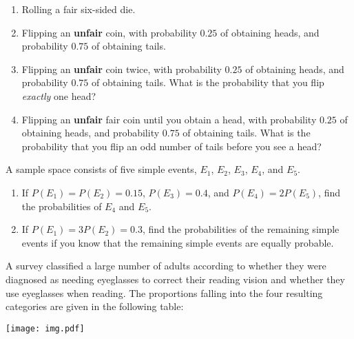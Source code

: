 \documentclass[12pt,reqno]{amsart}
\begin{document}
\medskip
\begin{enumerate}
\item Rolling a fair six-sided die.\vfill
\item Flipping an \textbf{unfair} coin, with probability $0.25$ of obtaining heads, and probability $0.75$ of obtaining tails.\vfill
\item Flipping an \textbf{unfair} coin twice, with probability $0.25$ of obtaining heads, and probability $0.75$ of obtaining tails. What is the probability that you flip \textit{exactly} one head?\vfill
\item Flipping an \textbf{unfair} fair coin until you obtain a head, with probability $0.25$ of obtaining heads, and probability $0.75$ of obtaining tails. What is the probability that you flip an odd number of tails before you see a head?\vfill
\end{enumerate}


















\prob A sample space consists of five simple events, $E_1$, $E_2$, $E_3$, $E_4$, and $E_5$.

\medskip
\begin{enumerate}
\item If $P(E_1) = P(E_2) = 0.15$, $P(E_3) = 0.4$, and $P(E_4) = 2P(E_5)$, find the probabilities of $E_4$ and $E_5$.\vfill
\item If $P(E_1) = 3P(E_2) = 0.3$, find the probabilities of the remaining simple events if you know that the remaining simple events are equally probable.\vfill
\end{enumerate}















\newpage
\prob A survey classified a large number of adults according to whether they were diagnosed as needing eyeglasses to correct their reading vision and whether they use eyeglasses when reading. The proportions falling into the four resulting categories are given in the following table:

\medskip
\begin{center}
\texttt{[image: img.pdf]}
\end{center}
\medskip
\end{document}
